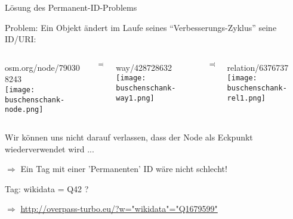 \documentclass{beamer}
\begin{document}
\begin{frame}{Lösung des Permanent-ID-Problems}

 \vspace*{-0.8cm}
  Problem: Ein Objekt ändert im Laufe seines "`Verbesserungs-Zyklus"' seine ID/URI:

 \vspace*{0.2cm}

  \begin{columns}[c]

    \begin{column}[T]{60mm}
      osm.org/node/790308243 \\
      \texttt{[image: buschenschank-node.png]}
    \end{column} 
    \pause

    \begin{column}[T]{5mm}
       \vspace*{1cm}
      $\Rightarrow$
    \end{column}

    \begin{column}[T]{20mm}
      way/428728632 \\
      \texttt{[image: buschenschank-way1.png]}
    \end{column}
    \pause

    \begin{column}[T]{5mm}
       \vspace*{1cm}
      $\Rightarrow$
    \end{column}

    \begin{column}[T]{20mm}
      relation/6376737 \\
      \texttt{[image: buschenschank-rel1.png]}
    \end{column}

  \end{columns}
 \vspace*{0.2cm}

  \pause

  Wir können uns nicht darauf verlassen, dass der Node als Eckpunkt wiederverwendet wird ... \pause
 \vspace*{0.2cm}
  
  $\Rightarrow$ Ein Tag mit einer 'Permanenten' ID wäre nicht schlecht! \pause
 \vspace*{0.2cm}

  Tag: wikidata = Q42 ?

  $\Rightarrow$ \href{http://overpass-turbo.eu/?w=\%22wikidata\%22\%3D\%22Q1679599\%22+global\&R}{http://overpass-turbo.eu/?w="wikidata"="Q1679599"}

\end{frame}
\end{document}
